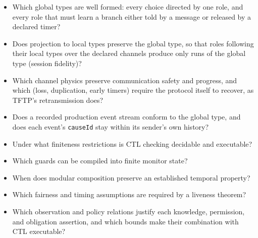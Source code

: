 \begin{itemize}
  \item Which global types are well formed: every choice directed by one role,
        and every role that must learn a branch either told by a message or
        released by a declared timer?
  \item Does projection to local types preserve the global type, so that roles
        following their local types over the declared channels produce only
        runs of the global type (session fidelity)?
  \item Which channel physics preserve communication safety and progress, and
        which (loss, duplication, early timers) require the protocol itself to
        recover, as TFTP's retransmission does?
  \item Does a recorded production event stream conform to the global type, and
        does each event's \texttt{causeId} stay within its sender's own
        history?
  \item Under what finiteness restrictions is CTL checking decidable and executable?
  \item Which guards can be compiled into finite monitor state?
  \item When does modular composition preserve an established temporal property?
  \item Which fairness and timing assumptions are required by a liveness theorem?
  \item Which observation and policy relations justify each knowledge,
        permission, and obligation assertion, and which bounds make their
        combination with CTL executable?
\end{itemize}
